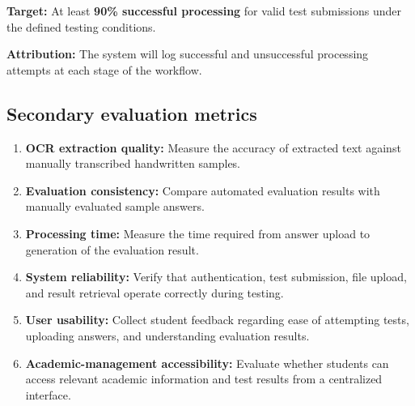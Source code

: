 \documentclass[11pt,a4paper]{article}
\begin{document}
\textbf{Target:} At least \textbf{90\% successful processing} for valid test submissions under the defined testing conditions.

\textbf{Attribution:} The system will log successful and unsuccessful processing attempts at each stage of the workflow.

\subsection{Secondary evaluation metrics}
\begin{enumerate}
    \item \textbf{OCR extraction quality:} Measure the accuracy of extracted text against manually transcribed handwritten samples.

    \item \textbf{Evaluation consistency:} Compare automated evaluation results with manually evaluated sample answers.

    \item \textbf{Processing time:} Measure the time required from answer upload to generation of the evaluation result.

    \item \textbf{System reliability:} Verify that authentication, test submission, file upload, and result retrieval operate correctly during testing.

    \item \textbf{User usability:} Collect student feedback regarding ease of attempting tests, uploading answers, and understanding evaluation results.

    \item \textbf{Academic-management accessibility:} Evaluate whether students can access relevant academic information and test results from a centralized interface.
\end{enumerate}
\end{document}
